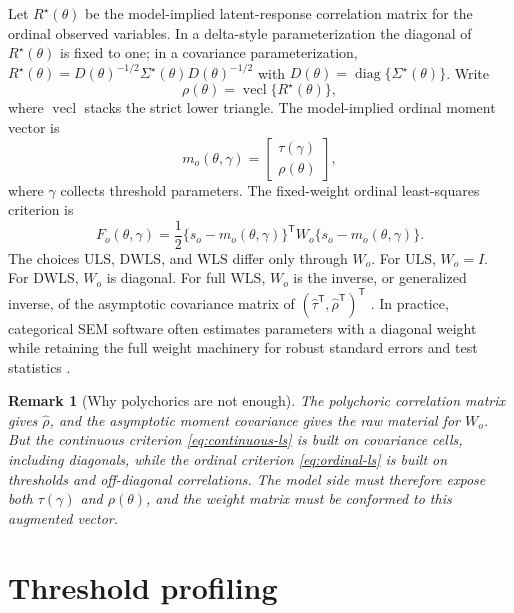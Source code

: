 \documentclass[11pt]{article}
\newtheorem{remark}{Remark}
\newcommand{\diag}{\operatorname{diag}}
\newcommand{\vecl}{\operatorname{vecl}}
\newcommand{\trans}{^{\mathsf T}}
\newcommand{\ULS}{\mathrm{ULS}}
\newcommand{\DWLS}{\mathrm{DWLS}}
\newcommand{\WLS}{\mathrm{WLS}}
\begin{document}
Let \(R^\star(\theta)\) be the model-implied latent-response correlation
matrix for the ordinal observed variables. In a delta-style parameterization
the diagonal of \(R^\star(\theta)\) is fixed to one; in a covariance
parameterization, \(R^\star(\theta)=D(\theta)^{-1/2}
\Sigma^\star(\theta)D(\theta)^{-1/2}\) with
\(D(\theta)=\diag\{\Sigma^\star(\theta)\}\). Write
\[
  \rho(\theta)=\vecl\{R^\star(\theta)\},
\]
where \(\vecl\) stacks the strict lower triangle. The model-implied ordinal
moment vector is
\begin{equation}
  m_o(\theta,\gamma)
  =
  \begin{bmatrix}
    \tau(\gamma) \\
    \rho(\theta)
  \end{bmatrix},
  \label{eq:ordinal-model-moments}
\end{equation}
where \(\gamma\) collects threshold parameters. The fixed-weight ordinal
least-squares criterion is
\begin{equation}
  F_o(\theta,\gamma)
  =
  \frac{1}{2}
  \{s_o-m_o(\theta,\gamma)\}\trans
  W_o
  \{s_o-m_o(\theta,\gamma)\}.
  \label{eq:ordinal-ls}
\end{equation}
The choices \(\ULS\), \(\DWLS\), and \(\WLS\) differ only through \(W_o\).
For \(\ULS\), \(W_o=I\). For \(\DWLS\), \(W_o\) is diagonal. For full
\(\WLS\), \(W_o\) is the inverse, or generalized inverse, of the asymptotic
covariance matrix of \((\hat\tau\trans,\hat\rho\trans)\trans\)
\citep{browne1984adf,bollen1989sem}. In practice, categorical SEM software
often estimates parameters with a diagonal weight while retaining the full
weight machinery for robust standard errors and test statistics
\citep{flora2004ordinal,li2016ordinal,rosseel2012lavaan}.

\begin{remark}[Why polychorics are not enough]
The polychoric correlation matrix gives \(\hat\rho\), and the asymptotic
moment covariance gives the raw material for \(W_o\). But the continuous
criterion \eqref{eq:continuous-ls} is built on covariance cells, including
diagonals, while the ordinal criterion \eqref{eq:ordinal-ls} is built on
thresholds and off-diagonal correlations. The model side must therefore expose
both \(\tau(\gamma)\) and \(\rho(\theta)\), and the weight matrix must be
conformed to this augmented vector.
\end{remark}

\section{Threshold profiling}
\label{sec:threshold-profiling}
\end{document}
